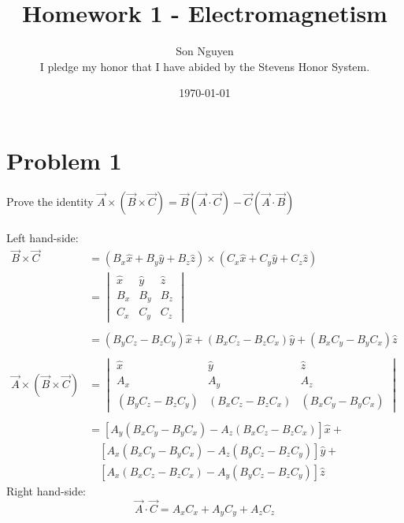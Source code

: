 \documentclass[12pt]{article}
\title{Homework 1 - Electromagnetism}
\author{Son Nguyen \\
I pledge my honor that I have abided by the Stevens Honor System.}
\date{\today}
\begin{document}
\maketitle

\section*{Problem 1}
Prove the identity \(\vec{A} \times (\vec{B} \times \vec{C}) = \vec{B} (\vec{A} \cdot \vec{C}) - \vec{C}  (\vec{A} \cdot \vec{B})\) \\ \\
Left hand-side:
\begin{align*}
	\vec{B} \times \vec{C}                  & = (B_x \hat{x} + B_y \hat{y} + B_z \hat{z}) \times (C_x \hat{x} + C_y \hat{y} + C_z \hat{z}) \\
	                                        & = \begin{vmatrix}
		                                            \hat{x} & \hat{y} & \hat{z} \\
		                                            B_x     & B_y     & B_z     \\
		                                            C_x     & C_y     & C_z
	                                            \end{vmatrix}                                                                \\ \\
	                                        & = (B_y C_z - B_z C_y) \hat{x} + (B_x C_z - B_z C_x) \hat{y} + (B_x C_y - B_y C_x) \hat{z}    \\ \\
	\vec{A} \times (\vec{B} \times \vec{C}) & =
	\begin{vmatrix}
		\hat{x}             & \hat{y}             & \hat{z}             \\
		A_x                 & A_y                 & A_z                 \\
		(B_y C_z - B_z C_y) & (B_x C_z - B_z C_x) & (B_x C_y - B_y C_x)
	\end{vmatrix}                                                                        \\ \\
	                                        & = [A_y(B_x C_y - B_y C_x) - A_z(B_x C_z - B_z C_x)] \hat{x} +                                \\
	                                        & \quad [A_x(B_x C_y - B_y C_x) - A_z(B_y C_z - B_z C_y)] \hat{y} +                            \\
	                                        & \quad [A_x(B_x C_z - B_z C_x) - A_y(B_y C_z - B_z C_y)] \hat{z}
\end{align*}
Right hand-side:
\[\vec{A} \cdot \vec{C} = A_x C_x + A_y C_y + A_z C_z\]
\end{document}

